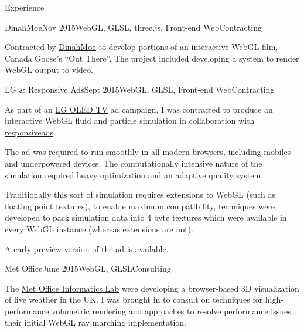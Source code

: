 \documentclass{resume} %
\begin{document}
\begin{rSection}{Experience}
\begin{rSubsection}{DinahMoe}{Nov 2015}{WebGL, GLSL, three.js, Front-end Web}{Contracting}
\item Contracted by \href{http://dinahmoe.com/}{DinahMoe} to develop portions of an interactive WebGL film, Canada Goose's ``Out There''. The project included developing a system to render WebGL output to video.
\end{rSubsection}

\begin{rSubsection}{LG \& Responsive Ads}{Sept 2015}{WebGL, GLSL, Front-end Web}{Contracting}
\item As part of an \href{http://www.lg.com/uk/oled-tv}{LG OLED TV} ad campaign, I was contracted to produce an interactive WebGL fluid and particle simulation in collaboration with \href{http://www.responsiveads.com/}{responsiveads}.
\item The ad was required to run smoothly in all modern browsers, including mobiles and underpowered devices. The computationally intensive nature of the simulation required heavy optimization and an adaptive quality system.
\item Traditionally this sort of simulation requires extensions to WebGL (such as floating point textures), to enable maximum compatibility, techniques were developed to pack simulation data into 4 byte textures which were available in every WebGL instance (whereas extensions are not).
\item A early preview version of the ad is \href{http://haxiomic.github.io/ig783wghhnod/new-brush/}{available}.
\end{rSubsection}

\begin{rSubsection}{Met Office}{June 2015}{WebGL, GLSL}{Consulting}
\item The \href{http://www.informaticslab.co.uk/}{Met Office Informatics Lab} were developing a browser-based 3D visualization of live weather in the UK. I was brought in to consult on techniques for high-performance volumetric rendering and approaches to resolve performance issues their initial WebGL ray marching implementation.
\end{rSubsection}


\end{rSection}
\end{document}
